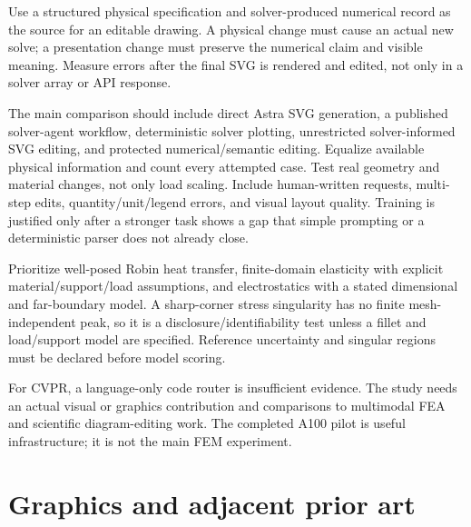 \documentclass[
  11pt,
  a4paper,
]{article}
\begin{document}
Use a structured physical specification and solver-produced numerical
record as the source for an editable drawing. A physical change must
cause an actual new solve; a presentation change must preserve the
numerical claim and visible meaning. Measure errors after the final SVG
is rendered and edited, not only in a solver array or API response.

The main comparison should include direct Astra SVG generation, a
published solver-agent workflow, deterministic solver plotting,
unrestricted solver-informed SVG editing, and protected
numerical/semantic editing. Equalize available physical information and
count every attempted case. Test real geometry and material changes, not
only load scaling. Include human-written requests, multi-step edits,
quantity/unit/legend errors, and visual layout quality. Training is
justified only after a stronger task shows a gap that simple prompting
or a deterministic parser does not already close.

Prioritize well-posed Robin heat transfer, finite-domain elasticity with
explicit material/support/load assumptions, and electrostatics with a
stated dimensional and far-boundary model. A sharp-corner stress
singularity has no finite mesh-independent peak, so it is a
disclosure/identifiability test unless a fillet and load/support model
are specified. Reference uncertainty and singular regions must be
declared before model scoring.

For CVPR, a language-only code router is insufficient evidence. The
study needs an actual visual or graphics contribution and comparisons to
multimodal FEA and scientific diagram-editing work. The completed A100
pilot is useful infrastructure; it is not the main FEM experiment.

\clearpage

\section{Graphics and adjacent prior
art}\label{graphics-and-adjacent-prior-art}
\end{document}
